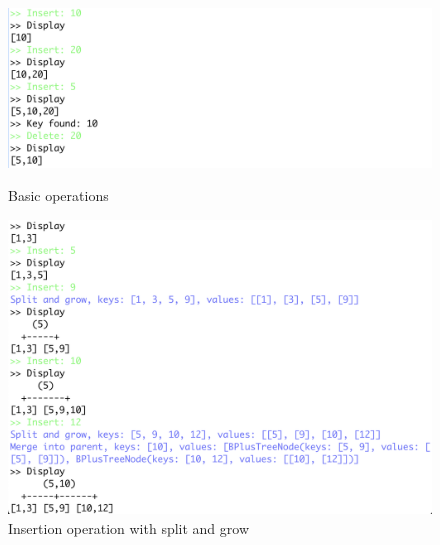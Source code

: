 \documentclass[11pt]{article}
\begin{document}
\begin{figure}[h!]
    \begin{minipage}[t]{0.48\textwidth}
        \centering
        \includegraphics[width=\textwidth]{figs/basic.png}
        \caption{Basic operations}
        \label{fig:basic}
    \end{minipage}
    \hfill
    \begin{minipage}[t]{0.48\textwidth}
        \centering
        \includegraphics[width=\textwidth]{figs/insertion.png}
        \caption{Insertion operation with split and grow}
        \label{fig:insertion}
    \end{minipage}
\end{figure}
\end{document}
